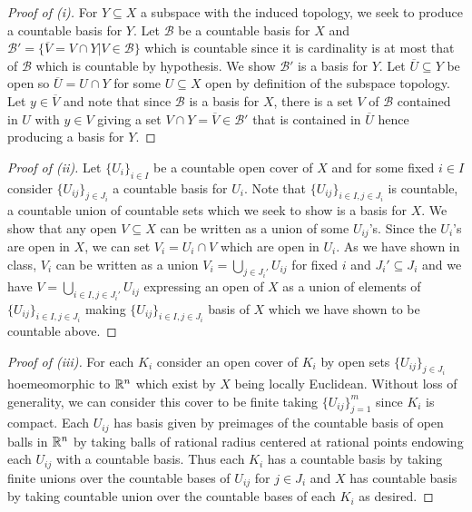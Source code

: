 \begin{proof}[Proof of (i)]
    For $Y\subseteq X$ a subspace with the induced topology, we seek to produce a countable basis for $Y$. Let $\mathcal{B}$ be a countable basis for $X$ and $\mathcal{B}'=\{\overline{V}=V\cap Y| V\in\mathcal{B}\}$ which is countable since it is cardinality is at most that of $\mathcal{B}$ which is countable by hypothesis. We show $\mathcal{B}'$ is a basis for $Y$.  Let $\overline{U}\subseteq Y$ be open so $\overline{U}=U\cap Y$ for some $U\subseteq X$ open by definition of the subspace topology. Let $y\in\overline{V}$ and note that since $\mathcal{B}$ is a basis for $X$, there is a set $V$ of $\mathcal{B}$ contained in $U$ with $y\in V$ giving a set $V\cap Y=\overline{V}\in\mathcal{B}'$ that is contained in $\overline{U}$ hence producing a basis for $Y$. 
  \end{proof}
  \begin{proof}[Proof of (ii)]
    Let $\{U_{i}\}_{i\in I}$ be a countable open cover of $X$ and for some fixed $i\in I$ consider $\{U_{ij}\}_{j\in J_{i}}$ a countable basis for $U_{i}$. Note that $\{U_{ij}\}_{i\in I, j\in J_{i}}$ is countable, a countable union of countable sets which we seek to show is a basis for $X$. We show that any open $V\subseteq X$ can be written as a union of some $U_{ij}$'s. Since the $U_{i}$'s are open in $X$, we can set $V_{i}=U_{i}\cap V$ which are open in $U_{i}$. As we have shown in class, $V_{i}$ can be written as a union $V_{i}=\bigcup_{j\in J_{i}'}U_{ij}$ for fixed $i$ and $J_{i}'\subseteq J_{i}$ and we have $V=\bigcup_{i\in I, j\in J_{i}'}U_{ij}$ expressing an open of $X$ as a union of elements of $\{U_{ij}\}_{i\in I, j\in J_{i}}$ making $\{U_{ij}\}_{i\in I, j\in J_{i}}$ basis of $X$ which we have shown to be countable above. 
  \end{proof}
  \begin{proof}[Proof of (iii)]
    For each $K_{i}$ consider an open cover of $K_{i}$ by open sets $\{U_{ij}\}_{j\in J_{i}}$ hoemeomorphic to $\mathbb{R}^{n}$ which exist by $X$ being locally Euclidean. Without loss of generality, we can consider this cover to be finite taking $\{U_{ij}\}_{j=1}^{m}$ since $K_{i}$ is compact. Each $U_{ij}$ has basis given by preimages of the countable basis of open balls in $\mathbb{R}^{n}$ by taking balls of rational radius centered at rational points endowing each $U_{ij}$ with a countable basis. Thus each $K_{i}$ has a countable basis by taking finite unions over the countable bases of $U_{ij}$ for $j\in J_{i}$ and $X$ has countable basis by taking countable union over the countable bases of each $K_{i}$ as desired. 
  \end{proof}
